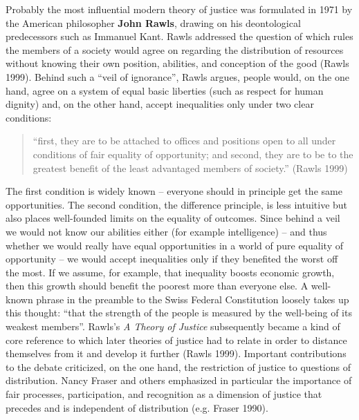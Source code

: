 \documentclass[
  british,
  a4paper,
  DIV=11,
  numbers=noendperiod,
  oneside,
  openany]{scrreprt}
\begin{document}
Probably the most influential modern theory of justice was formulated in
1971 by the American philosopher \textbf{John Rawls}, drawing on his
deontological predecessors such as Immanuel Kant. Rawls addressed the
question of which rules the members of a society would agree on
regarding the distribution of resources without knowing their own
position, abilities, and conception of the good (Rawls 1999). Behind
such a ``veil of ignorance'', Rawls argues, people would, on the one
hand, agree on a system of equal basic liberties (such as respect for
human dignity) and, on the other hand, accept inequalities only under
two clear conditions:

\begin{quote}
``first, they are to be attached to offices and positions open to all
under conditions of fair equality of opportunity; and second, they are
to be to the greatest benefit of the least advantaged members of
society.'' (Rawls 1999)
\end{quote}

The first condition is widely known -- everyone should in principle get
the same opportunities. The second condition, the difference principle,
is less intuitive but also places well-founded limits on the equality of
outcomes. Since behind a veil we would not know our abilities either
(for example intelligence) -- and thus whether we would really have
equal opportunities in a world of pure equality of opportunity -- we
would accept inequalities only if they benefited the worst off the most.
If we assume, for example, that inequality boosts economic growth, then
this growth should benefit the poorest more than everyone else. A
well-known phrase in the preamble to the Swiss Federal Constitution
loosely takes up this thought: ``that the strength of the people is
measured by the well-being of its weakest members''. Rawls's \emph{A
Theory of Justice} subsequently became a kind of core reference to which
later theories of justice had to relate in order to distance themselves
from it and develop it further (Rawls 1999). Important contributions to
the debate criticized, on the one hand, the restriction of justice to
questions of distribution. Nancy Fraser and others emphasized in
particular the importance of fair processes, participation, and
recognition as a dimension of justice that precedes and is independent
of distribution (e.g. Fraser 1990).
\end{document}
